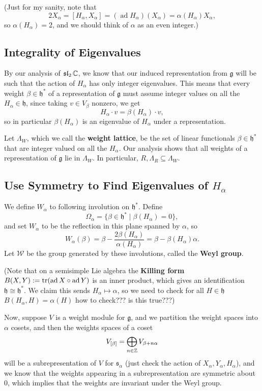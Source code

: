 \documentclass[12pt]{article}
\newcommand{\fg}{\mathfrak{g}}
\newcommand{\fh}{\mathfrak{h}}
\newcommand{\fs}{\mathfrak{s}}
\DeclareMathOperator{\ad}{ad}
\newcommand{\fsl}{\operatorname{\mathfrak{sl}}}
\DeclareMathOperator{\tr}{tr}
\newcommand{\cW}{\mathcal{W}}
\begin{document}
(Just for my sanity, note that
\[2X_\alpha = [H_\alpha,X_\alpha] = (\ad H_\alpha)(X_\alpha)=\alpha(H_\alpha)X_\alpha,\]
so $\alpha(H_\alpha)=2$, and we should think of $\alpha$ as an even integer.)

\subsection{Integrality of Eigenvalues}

By our analysis of $\fsl_2\C$, we know that our induced representation from $\fg$ will be such that the action of $H_\alpha$ has only integer eigenvalues. This means that every weight $\beta\in \fh^*$ of a representation of $\fg$ must assume integer values on all the $H_\alpha\in \fh$, since taking $v \in V_\beta$ nonzero, we get
\[H_\alpha \cdot v = \beta(H_\alpha)\cdot v,\]
so in particular $\beta(H_\alpha)$ is an eigenvalue of $H_\alpha$ under a representation.

Let $\Lambda_W$, which we call the \textbf{weight lattice}, be the set of linear functionals $\beta \in \fh^*$ that are integer valued on all the $H_\alpha$. Our analysis shows that all weights of a representation of $\fg$ lie in $\Lambda_W$. In particular, $R,\Lambda_R \subseteq \Lambda_W$.

\subsection{Use Symmetry to Find Eigenvalues of $H_\alpha$}

We define $W_\alpha$ to following involution on $\fh^*$. Define
\[\Omega_\alpha = \{\beta\in \fh^* \mid \beta(H_\alpha)=0\},\]
and set $W_\alpha$ to be the reflection in this plane spanned by $\alpha$, so
\[W_\alpha(\beta) = \beta - \frac{2\beta(H_\alpha)}{\alpha(H_\alpha)} = \beta - \beta(H_\alpha)\alpha.\]
Let $\cW$ be the group generated by these involutions, called the \textbf{Weyl group}.

(Note that on a semisimple Lie algebra the \textbf{Killing form} $B(X,Y)\defeq \tr(\ad X \circ \ad Y)$ is an inner product, which gives an identification $\fh\cong \fh^*$. We claim this sends $H_\alpha \mapsto \alpha$, so we need to check for all $H\in \fh$ $B(H_\alpha,H)=\alpha(H)$ {\color{red} how to check??? is this true???})

Now, suppose $V$ is a weight module for $\fg$, and we partition the weight spaces into $\alpha$ cosets, and then the weights spaces of a coset
\[V_{[\beta]} = \bigoplus_{n\in \mathbb{Z}} V_{\beta+n\alpha}\]
will be a subrepresentation of $V$ for $\fs_\alpha$ (just check the action of $X_\alpha,Y_\alpha,H_\alpha$), and we know that the weights appearing in a subrepresentation are symmetric about 0, which implies that the weights are invariant under the Weyl group.
\end{document}
